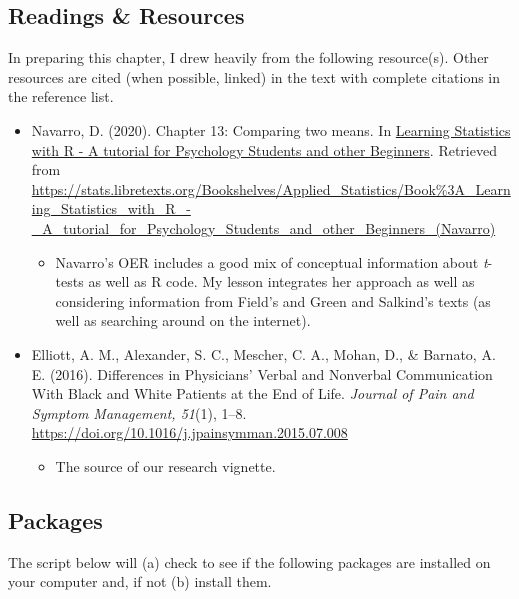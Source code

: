 \documentclass[
  11pt,
]{book}
\providecommand{\tightlist}{%
  \setlength{\itemsep}{0pt}\setlength{\parskip}{0pt}}
\begin{document}
\hypertarget{readings-resources-2}{%
\subsection{Readings \& Resources}\label{readings-resources-2}}

In preparing this chapter, I drew heavily from the following resource(s). Other resources are cited (when possible, linked) in the text with complete citations in the reference list.

\begin{itemize}
\tightlist
\item
  Navarro, D. (2020). Chapter 13: Comparing two means. In \href{https://learningstatisticswithr.com/}{Learning Statistics with R - A tutorial for Psychology Students and other Beginners}. Retrieved from \url{https://stats.libretexts.org/Bookshelves/Applied_Statistics/Book\%3A_Learning_Statistics_with_R_-_A_tutorial_for_Psychology_Students_and_other_Beginners_(Navarro)}

  \begin{itemize}
  \tightlist
  \item
    Navarro's OER includes a good mix of conceptual information about \emph{t}-tests as well as R code. My lesson integrates her approach as well as considering information from Field's \citeyearpar{field_discovering_2012} and Green and Salkind's \citep{green_using_2017} texts (as well as searching around on the internet).
  \end{itemize}
\item
  Elliott, A. M., Alexander, S. C., Mescher, C. A., Mohan, D., \& Barnato, A. E. (2016). Differences in Physicians' Verbal and Nonverbal Communication With Black and White Patients at the End of Life. \emph{Journal of Pain and Symptom Management, 51}(1), 1--8. \url{https://doi.org/10.1016/j.jpainsymman.2015.07.008}

  \begin{itemize}
  \tightlist
  \item
    The source of our research vignette.
  \end{itemize}
\end{itemize}

\hypertarget{packages-1}{%
\subsection{Packages}\label{packages-1}}

The script below will (a) check to see if the following packages are installed on your computer and, if not (b) install them.
\end{document}
